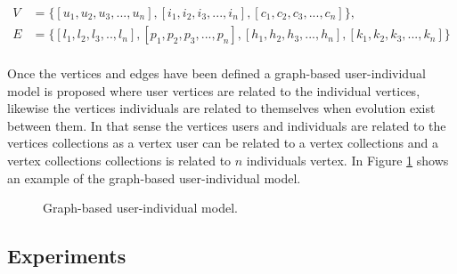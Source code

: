 \documentclass[conference]{IEEEtran}
\begin{document}
\begin{equation*}\label{eq:graphRelDef} 
\displaystyle 
\begin{split} 
V &= \{[u_1,u_2,u_3,...,u_n],[i_1,i_2,i_3,...,i_n],[c_1,c_2,c_3,...,c_n]\},\\ 
E&= \{[l_1,l_2,l_3,..,l_n],[p_1,p_2,p_3,...,p_n],[h_1,h_2,h_3,...,h_n],[k_1,k_2,k_3,...,k_n]\}\\ 
\end{split} 
\end{equation*} 

Once  the vertices and edges have been defined a graph-based user-individual model is
proposed where  user vertices are related to the individual vertices, likewise
the vertices individuals are related to themselves when evolution exist between
them. %
In that sense the vertices users and individuals are related to the
vertices collections as a vertex user can be related to a vertex collections and
a vertex collections collections is related to $n$ individuals vertex. In Figure
\ref{fig:user_moder} shows an example of the graph-based user-individual model.

\begin{figure}
\captionsetup{justification=centering,margin=2cm}
\centering
\setlength\fboxsep{0pt}
\setlength\fboxrule{0.7pt}
\caption{Graph-based user-individual model.}
\label{fig:user_moder}       
\end{figure}

\subsection{Experiments}
\label{sec:experiments}
\end{document}
